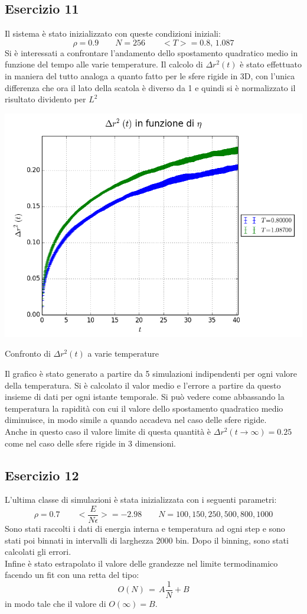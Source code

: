 \subsection{Esercizio 11}
Il sistema è stato inizializzato con queste condizioni iniziali:
$$
	\rho = 0.9 \qquad N=256 \qquad <T> = 0.8,\, 1.087
$$
Si è interessati a confrontare l'andamento dello spostamento quadratico medio in funzione del tempo alle varie temperature. Il calcolo di $\Delta r^2(t)$ è stato effettuato in maniera del tutto analoga a quanto fatto per le sfere rigide in 3D, con l'unica differenza che ora il lato della scatola è diverso da 1 e quindi si è normalizzato il risultato dividento per $L^2$
\begin{myfig}[h]
\includegraphics[scale=0.6]{soft_core/11_dr2pepe.png}
\caption{Confronto di $\Delta r^2(t)$ a varie temperature}
\end{myfig}
Il grafico è stato generato a partire da 5 simulazioni indipendenti per ogni valore della temperatura. Si è calcolato il valor medio e l'errore a partire da questo insieme di dati per ogni istante temporale.
Si può vedere come abbassando la temperatura la rapidità con cui il valore dello spostamento quadratico medio diminuisce, in modo simile a quando accadeva nel caso delle sfere rigide.\\
Anche in questo caso il valore limite di questa quantità è $\Delta r^2(t \rightarrow \infty) = 0.25$ come nel caso delle sfere rigide in 3 dimensioni.

\subsection{Esercizio 12}
L'ultima classe di simulazioni è stata inizializzata con i seguenti parametri:
$$
 \rho = 0.7 \qquad <\frac{E}{N \epsilon}> = -2.98 \qquad N = 100,150,250,500,800,1000
$$
Sono stati raccolti i dati di energia interna e temperatura ad ogni step e sono stati poi binnati in intervalli di larghezza 2000 bin.
Dopo il binning, sono stati calcolati gli errori.\\
Infine è stato estrapolato il valore delle grandezze nel limite termodinamico facendo un fit con una retta del tipo:
$$
	O(N) \, = \,A \frac{1}{N} + B
$$
in modo tale che il valore di $O(\infty) = B$.


